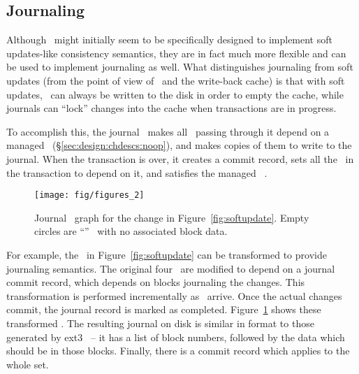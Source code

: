 \subsection{Journaling}
\label{sec:consistency:journal}

Although \chdescs\ might initially seem to be specifically designed to
implement soft updates-like consistency semantics, they are in fact much more
flexible and can be used to implement journaling as well. What distinguishes
journaling from soft updates (from the point of view of \chdescs\ and
the write-back cache) is that with soft updates, \chdescs\ can always
be written to the disk in order to empty the cache, while journals can
``lock'' changes into the cache when transactions are in progress.

To accomplish this, the journal \module\ makes all \chdescs\ passing through it
depend on a managed \noop\ \chdesc (\S\ref{sec:design:chdescs:noop}), and makes
copies of them to write to the journal. When the transaction is over, it creates
a commit record, sets all the \chdescs\ in the transaction to depend on it, and
satisfies the managed \noop\ \chdesc.

\begin{figure}
  \centering
  \texttt{[image: fig/figures\_2]}
  \caption{\label{fig:journal} Journal \chdesc\ graph for the
    change in Figure~\ref{fig:softupdate}. Empty circles are
    ``\noop'' \chdescs\ with no associated block data.}
\end{figure}

For example, the \chdescs\ in Figure~\ref{fig:softupdate} can be
transformed to provide journaling semantics. The original four \chdescs\
are modified to depend on a journal commit record, which depends on blocks
journaling the changes. This transformation is performed incrementally as
\chdescs\ arrive. Once the actual changes commit, the journal record is
marked as completed. Figure~\ref{fig:journal} shows these transformed
\chdescs. The resulting journal on disk is similar in format to those
generated by ext3~\cite{tweedie98journaling} -- it has a list of block
numbers, followed by the data which should be in those blocks. Finally,
there is a commit record which applies to the whole set.

